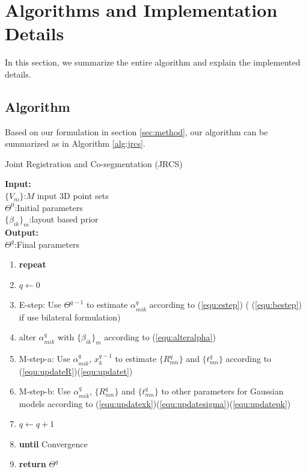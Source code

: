 \section{Algorithms and Implementation Details}
\label{sec:imp}
In this section, we summarize the entire algorithm and explain the implemented details.\\ 
\subsection{Algorithm}
Based on our formulation in section \ref{sec:method}, our algorithm can be summarized as in Algorithm \ref{alg:jrcs}.
\begin{algorithm}[htb]
	\caption{Joint Registration and Co-segmentation (JRCS)}
	\label{alg:jrcs}
	\textbf{Input:}~~\\
	$\{V_m\}$:$M$ input 3D point sets\\
	$\Theta^0$:Initial parameters~~\\
	$\{\beta_{ik}\}_{m}$:layout based prior\\
	\textbf{Output:}~~\\
	$\Theta^q$:Final parameters~~
	\begin{enumerate}
		\item \textbf{repeat}
		\item $q\leftarrow0$
		\item E-step: Use $\Theta^{q-1}$ to estimate $\alpha_{mik}^q$ according to (\ref{equ:estep}) ( (\ref{equ:bestep}) if use bilateral formulation)
		\item alter $\alpha_{mik}^q$ with $\{\beta_{ik}\}_{m}$ according to (\ref{equ:alteralpha})
		\item M-step-a: Use $\alpha^q_{mik}$, $x^{q-1}_k$ to estimate $\{R_{mn}^q\}$ and $\{t_{mn}^q\}$ according to (\ref{equ:updateR})(\ref{equ:updatet})
		\item M-step-b: Use $\alpha^q_{mik}$, $\{R_{mn}^q\}$ and $\{t_{mn}^q\}$ to other parameters for Gaussian models according to (\ref{equ:updatexk})(\ref{equ:updatesigma})(\ref{equ:updatepk})
		\item $q \leftarrow q+1$
		\item \textbf{until} Convergence
		\item \textbf{return} $\Theta^q$
	\end{enumerate}
\end{algorithm}

